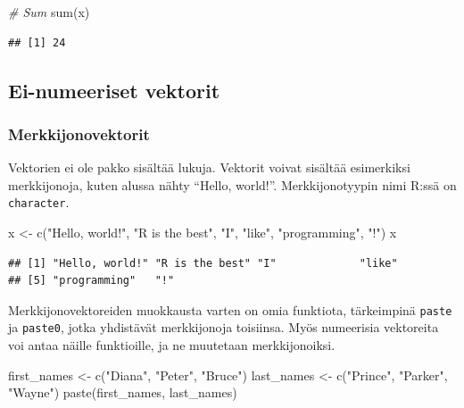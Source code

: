 \documentclass[
]{book}
\newenvironment{Shaded}{\begin{snugshade}}{\end{snugshade}}
\newcommand{\CommentTok}[1]{\textcolor[rgb]{0.56,0.35,0.01}{\textit{#1}}}
\newcommand{\FunctionTok}[1]{\textcolor[rgb]{0.00,0.00,0.00}{#1}}
\newcommand{\NormalTok}[1]{#1}
\newcommand{\OtherTok}[1]{\textcolor[rgb]{0.56,0.35,0.01}{#1}}
\newcommand{\StringTok}[1]{\textcolor[rgb]{0.31,0.60,0.02}{#1}}
\begin{document}
\begin{Shaded}
\begin{Highlighting}[]
\CommentTok{\# Sum}
\FunctionTok{sum}\NormalTok{(x)}
\end{Highlighting}
\end{Shaded}

\begin{verbatim}
## [1] 24
\end{verbatim}

\hypertarget{ei-numeeriset-vektorit}{%
\subsection{Ei-numeeriset vektorit}\label{ei-numeeriset-vektorit}}

\hypertarget{merkkijonovektorit}{%
\subsubsection{Merkkijonovektorit}\label{merkkijonovektorit}}

Vektorien ei ole pakko sisältää lukuja. Vektorit voivat sisältää esimerkiksi merkkijonoja, kuten alussa nähty ``Hello, world!''. Merkkijonotyypin nimi R:ssä on \texttt{character}.

\begin{Shaded}
\begin{Highlighting}[]
\NormalTok{x }\OtherTok{\textless{}{-}} \FunctionTok{c}\NormalTok{(}\StringTok{"Hello, world!"}\NormalTok{, }\StringTok{"R is the best"}\NormalTok{, }\StringTok{"I"}\NormalTok{, }\StringTok{"like"}\NormalTok{, }\StringTok{"programming"}\NormalTok{, }\StringTok{"!"}\NormalTok{)}
\NormalTok{x}
\end{Highlighting}
\end{Shaded}

\begin{verbatim}
## [1] "Hello, world!" "R is the best" "I"             "like"         
## [5] "programming"   "!"
\end{verbatim}

Merkkijonovektoreiden muokkausta varten on omia funktiota, tärkeimpinä \texttt{paste} ja \texttt{paste0}, jotka yhdistävät merkkijonoja toisiinsa. Myös numeerisia vektoreita voi antaa näille funktioille, ja ne muutetaan merkkijonoiksi.

\begin{Shaded}
\begin{Highlighting}[]
\NormalTok{first\_names }\OtherTok{\textless{}{-}} \FunctionTok{c}\NormalTok{(}\StringTok{"Diana"}\NormalTok{, }\StringTok{"Peter"}\NormalTok{, }\StringTok{"Bruce"}\NormalTok{)}
\NormalTok{last\_names }\OtherTok{\textless{}{-}} \FunctionTok{c}\NormalTok{(}\StringTok{"Prince"}\NormalTok{, }\StringTok{"Parker"}\NormalTok{, }\StringTok{"Wayne"}\NormalTok{)}
\FunctionTok{paste}\NormalTok{(first\_names, last\_names)}
\end{Highlighting}
\end{Shaded}
\end{document}
